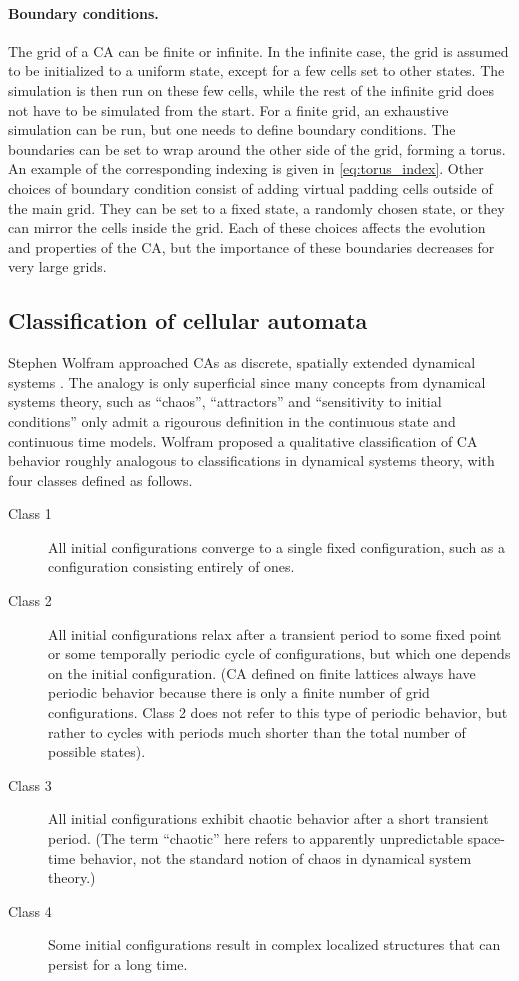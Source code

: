 \paragraph{Boundary conditions.}
The grid of a \ac{CA} can be finite or infinite. In the infinite case, the grid
is assumed to be initialized to a uniform state, except for a few cells set to
other states. The simulation is then run on these few cells, while the rest of
the infinite grid does not have to be simulated from the start. For a finite
grid, an exhaustive simulation can be run, but one needs to define
boundary conditions. The boundaries can be set to wrap around the other side of the
grid, forming a torus. An example of the corresponding indexing is given in
\eqref{eq:torus_index}. Other choices of boundary condition consist of adding
virtual padding cells outside of the main grid. They can be set to a fixed
state, a randomly chosen state, or they can mirror the cells inside the grid.
Each of these choices affects the evolution and properties of the \ac{CA}, but
the importance of these boundaries decreases for very large grids.

\subsection{Classification of cellular automata\label{sec:class-cell-autom}}

Stephen Wolfram approached \acp{CA} as discrete, spatially extended dynamical
systems \parencite{wolframUniversalityComplexityCellular1984}. The analogy is
only superficial since many concepts from dynamical systems theory, such as
``chaos'', ``attractors'' and ``sensitivity to initial conditions'' only admit a
rigourous definition in the continuous state and continuous time models. Wolfram
proposed a qualitative classification of CA behavior roughly analogous to
classifications in dynamical systems theory, with four classes defined as
follows.

\begin{description}
  \item[Class 1] All initial configurations converge to a single fixed configuration, such as a configuration consisting entirely of ones.
  \item[Class 2] All initial configurations relax after a transient period to some
        fixed point or some temporally periodic cycle of configurations, but
        which one depends on the initial configuration. (\ac{CA} defined on
        finite lattices always have periodic behavior because there
        is only a finite number of grid configurations. Class 2 does not refer to
        this type of periodic behavior, but rather to cycles with periods much
        shorter than the total number of possible states).
  \item[Class 3] All initial configurations exhibit chaotic behavior
        after a short transient period. (The term “chaotic” here refers to
        apparently unpredictable space-time behavior, not the standard notion 
        of chaos in dynamical system theory.)
  \item[Class 4] Some initial configurations result in complex localized
        structures that can persist for a long time.
\end{description}

